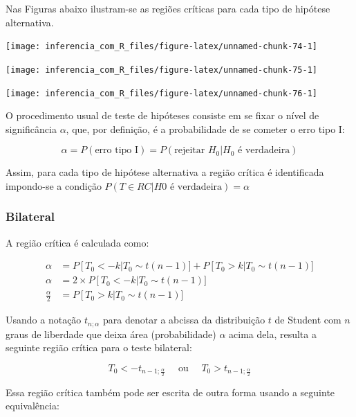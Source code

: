 \documentclass[
]{book}
\begin{document}
Nas Figuras abaixo ilustram-se as regiões críticas para cada tipo de hipótese alternativa.

\begin{center}\texttt{[image: inferencia\_com\_R\_files/figure-latex/unnamed-chunk-74-1]} \end{center}

\begin{center}\texttt{[image: inferencia\_com\_R\_files/figure-latex/unnamed-chunk-75-1]} \end{center}

\begin{center}\texttt{[image: inferencia\_com\_R\_files/figure-latex/unnamed-chunk-76-1]} \end{center}

O procedimento usual de teste de hipóteses consiste em se fixar o nível de significância \(\alpha\), que, por definição, é a probabilidade de se cometer o erro tipo I:

\[\alpha = P(\text{erro tipo I}) = P(\text{rejeitar }H_0|H_0\text{ é verdadeira})\]

Assim, para cada tipo de hipótese alternativa a região crítica é identificada impondo-se a condição \(P(T \in RC|H0\text{ é verdadeira}) = \alpha\)

\hypertarget{bilateral-1}{%
\subsubsection{Bilateral}\label{bilateral-1}}

A região crítica é calculada como:

\[
\begin{aligned}
\alpha&=P\left[T_0<-k\right|T_0\sim t(n-1)]+P\left[T_0>k\right|T_0\sim t(n-1)]\\
\alpha&=2\times P\left[T_0<-k\right|T_0\sim t(n-1)]\\
\frac{\alpha}{2}&=P\left[T_0>k\right|T_0\sim t(n-1)]
\end{aligned}
\]

Usando a notação \(t_{n;\alpha}\) para denotar a abcissa da distribuição \(t\) de Student com \(n\) graus de liberdade que deixa área (probabilidade) \(\alpha\) acima dela, resulta a seguinte região crítica para o teste bilateral:

\[T_0<-t_{n-1;\frac{\alpha}{2}}~~~~~~\text{ou}~~~~~~T_0>t_{n-1;\frac{\alpha}{2}}\]

Essa região crítica também pode ser escrita de outra forma usando a seguinte equivalência:
\end{document}
